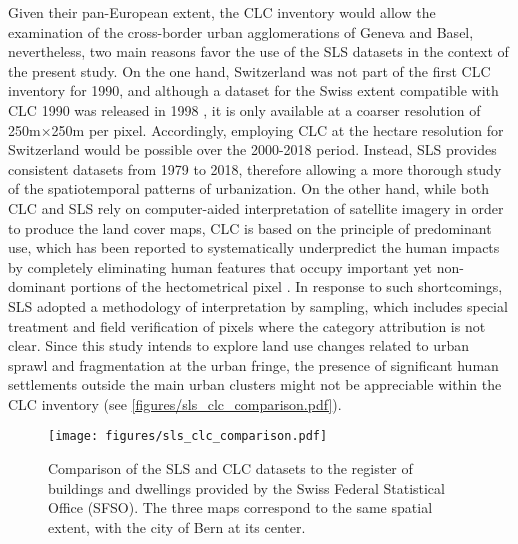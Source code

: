 \documentclass[10pt,letterpaper]{article}
\begin{document}
Given their pan-European extent, the CLC inventory would allow the examination of the cross-border urban agglomerations of Geneva and Basel, nevertheless, two main reasons favor the use of the SLS datasets in the context of the present study.
On the one hand, Switzerland was not part of the first CLC inventory for 1990, and although a dataset for the Swiss extent compatible with CLC 1990 was released in 1998 \cite{steinmeier2013corine}, it is only available at a coarser resolution of 250m$\times$250m per pixel. Accordingly, employing CLC at the hectare resolution for Switzerland would be possible over the 2000-2018 period. Instead, SLS provides consistent datasets from 1979 to 2018, therefore allowing a more thorough study of the spatiotemporal patterns of urbanization.
On the other hand, while both CLC and SLS rely on computer-aided interpretation of satellite imagery in order to produce the land cover maps, CLC is based on the principle of predominant use, which has been reported to systematically underpredict the human impacts by completely eliminating human features that occupy important yet non-dominant portions of the hectometrical pixel \cite{sfso2017statistique}. In response to such shortcomings, SLS adopted a methodology of interpretation by sampling, which includes special treatment and field verification of pixels where the category attribution is not clear. Since this study intends to explore land use changes related to urban sprawl and fragmentation at the urban fringe, the presence of significant human settlements outside the main urban clusters might not be appreciable within the CLC inventory (see \autoref{figures/sls_clc_comparison.pdf}).

\begin{figure}[!ht]
  \begin{adjustwidth}{-.4\textwidth}{0cm}
    \centering  
    \texttt{[image: figures/sls\_clc\_comparison.pdf]}
    \vspace{.5em}
    \caption[Comparison of SLS and CLC]{\label{figures/sls_clc_comparison.pdf}Comparison of the SLS and CLC datasets to the register of buildings and dwellings provided by the Swiss Federal Statistical Office (SFSO). The three maps correspond to the same spatial extent, with the city of Bern at its center.}
  \end{adjustwidth}
\end{figure}
\end{document}

